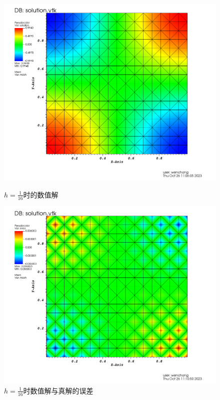 \documentclass[lang=cn,11pt,a4paper]{elegantpaper}
\begin{document}
\begin{figure}[H]
    \centering
    \begin{minipage}[t]{0.48\textwidth}
        \centering
        \includegraphics[width=\linewidth]{fig/solution.png}
        \caption{$h=\frac{1}{16}$时的数值解}
    \end{minipage}
    \begin{minipage}[t]{0.48\textwidth}
        \centering
        \includegraphics[width=\linewidth]{fig/error.png}
        \caption{$h=\frac{1}{16}$时数值解与真解的误差}
    \end{minipage}
\end{figure}
\end{document}
